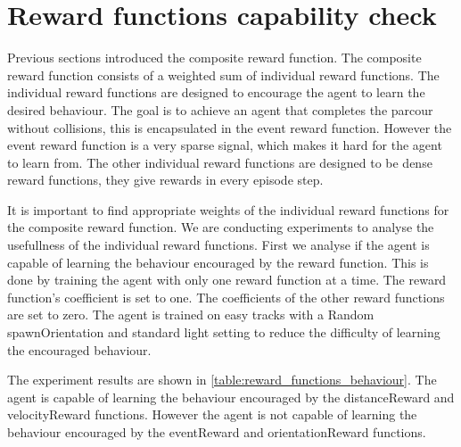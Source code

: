 \section{Reward functions capability check}

Previous sections introduced the composite reward function. The composite reward function consists of a weighted sum of individual reward functions. The individual reward functions are designed to encourage the agent to learn the desired behaviour. The goal is to achieve an agent that completes the parcour without collisions, this is encapsulated in the event reward function. However the event reward function is a very sparse signal, which makes it hard for the agent to learn from. The other individual reward functions are designed to be dense reward functions, they give rewards in every episode step.

It is important to find appropriate weights of the individual reward functions for the composite reward function. We are conducting experiments to analyse the usefullness of the individual reward functions. First we analyse if the agent is capable of learning the behaviour encouraged by the reward function.
This is done by training the agent with only one reward function at a time. The reward function's coefficient is set to one. The coefficients of the other reward functions are set to zero. The agent is trained on easy tracks with a Random spawnOrientation and standard light setting to reduce the difficulty of learning the encouraged behaviour.


The experiment results are shown in \ref{table:reward_functions_behaviour}. The agent is capable of learning the behaviour encouraged by the distanceReward and velocityReward functions. However the agent is not capable of learning the behaviour encouraged by the eventReward and orientationReward functions.


